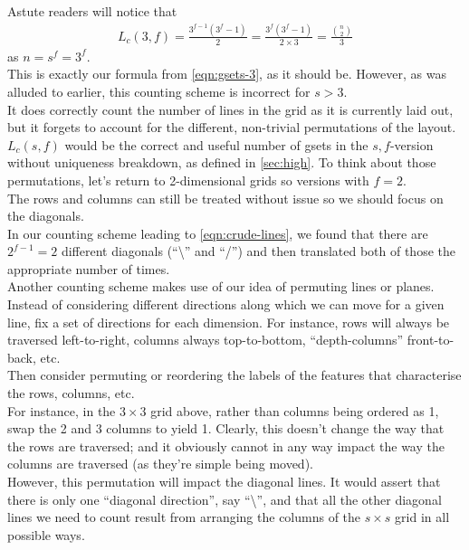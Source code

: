 \documentclass{article}
\theoremstyle{definition}
\theoremstyle{remark}
\begin{document}
Astute readers will notice that 
\begin{align}
    L_c(3,f)=\frac{3^{f-1}(3^f-1)}{2}=\frac{3^{f}(3^f-1)}{2\times3}=\frac{\binom{n}{2}}{3}
\end{align}
as $n=s^f=3^f$.\\
This is exactly our formula from \autoref{eqn:gsets-3}, as it should be.
\medbreak
However, as was alluded to earlier, this counting scheme is incorrect for $s>3$.\\
It does correctly count the number of lines in the grid as it is currently laid out, but it forgets to account for the different, non-trivial permutations of the layout.\\
$L_c(s,f)$ would be the correct and useful number of gsets in the $s,f$-version without uniqueness breakdown, as defined in \autoref{sec:high}. 
\medbreak
To think about those permutations, let's return to 2-dimensional grids so versions with $f=2$.\\
The rows and columns can still be treated without issue so we should focus on the diagonals.\\
In our counting scheme leading to \autoref{eqn:crude-lines}, we found that there are $2^{f-1}=2$ different diagonals (``\textbackslash'' and ``/'') and then translated both of those the appropriate number of times.\\
Another counting scheme makes use of our idea of permuting lines or planes.\\
Instead of considering different directions along which we can move for a given line, fix a set of directions for each dimension. For instance, rows will always be traversed left-to-right, columns always top-to-bottom, ``depth-columns'' front-to-back, etc.\\
Then consider permuting or reordering the labels of the features that characterise the rows, columns, etc.\\
For instance, in the $3\times 3$ grid above, rather than columns being ordered as 1, swap the 2 and 3 columns to yield 1. Clearly, this doesn't change the way that the rows are traversed; and it obviously cannot in any way impact the way the columns are traversed (as they're simple being moved).\\
However, this permutation will impact the diagonal lines.
It would assert that there is only one ``diagonal direction'', say ``\textbackslash'', and that all the other diagonal lines we need to count result from arranging the columns of the $s\times s$ grid in all possible ways.\\
\end{document}
